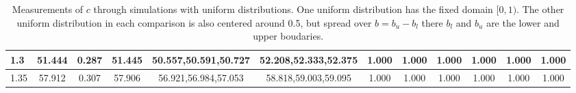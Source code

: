 \begin{table*}[h!]
\begin{center}
\begin{tabular}{| l | c | c | c | c | c | c | c | c | c | c | c |}
1.3 & 51.444 & 0.287 & 51.445 & 50.557,50.591,50.727 & 52.208,52.333,52.375  & 1.000  & 1.000  & 1.000  & 1.000  & 1.000  & 1.000 \\\hline
1.35 & 57.912 & 0.307 & 57.906 & 56.921,56.984,57.053 & 58.818,59.003,59.095  & 1.000  & 1.000  & 1.000  & 1.000  & 1.000  & 1.000 \\\hline
\end{tabular}
\caption{Measurements of $c$ through simulations
with uniform distributions.
One uniform distribution has the fixed domain $[0,1)$.
The other uniform distribution in each comparison
is also centered around 0.5,
but spread over $b=b_u-b_l$ there $b_l$ and $b_u$ are the lower and upper boudaries.}
\end{center}
\end{table*}